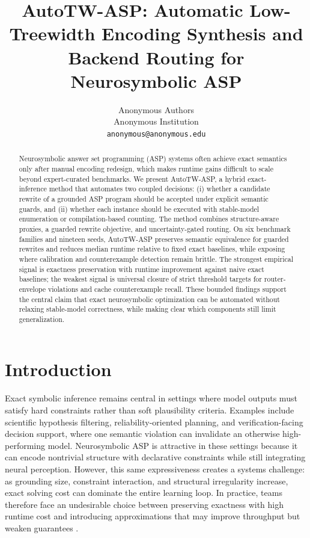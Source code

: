 \documentclass{article} %
\title{AutoTW-ASP: Automatic Low-Treewidth Encoding Synthesis and Backend Routing for Neurosymbolic ASP}
\author{Anonymous Authors \\
Anonymous Institution \\
\texttt{anonymous@anonymous.edu}}
\begin{document}
\maketitle

\begin{abstract}
Neurosymbolic answer set programming (ASP) systems often achieve exact semantics only after manual encoding redesign, which makes runtime gains difficult to scale beyond expert-curated benchmarks. We present AutoTW-ASP, a hybrid exact-inference method that automates two coupled decisions: (i) whether a candidate rewrite of a grounded ASP program should be accepted under explicit semantic guards, and (ii) whether each instance should be executed with stable-model enumeration or compilation-based counting. The method combines structure-aware proxies, a guarded rewrite objective, and uncertainty-gated routing. On six benchmark families and nineteen seeds, AutoTW-ASP preserves semantic equivalence for guarded rewrites and reduces median runtime relative to fixed exact baselines, while exposing where calibration and counterexample detection remain brittle. The strongest empirical signal is exactness preservation with runtime improvement against naive exact baselines; the weakest signal is universal closure of strict threshold targets for router-envelope violations and cache counterexample recall. These bounded findings support the central claim that exact neurosymbolic optimization can be automated without relaxing stable-model correctness, while making clear which components still limit generalization.
\end{abstract}

\section{Introduction}
\label{sec:intro}
Exact symbolic inference remains central in settings where model outputs must satisfy hard constraints rather than soft plausibility criteria. Examples include scientific hypothesis filtering, reliability-oriented planning, and verification-facing decision support, where one semantic violation can invalidate an otherwise high-performing model. Neurosymbolic ASP is attractive in these settings because it can encode nontrivial structure with declarative constraints while still integrating neural perception. However, this same expressiveness creates a systems challenge: as grounding size, constraint interaction, and structural irregularity increase, exact solving cost can dominate the entire learning loop. In practice, teams therefore face an undesirable choice between preserving exactness with high runtime cost and introducing approximations that may improve throughput but weaken guarantees \citep{src_012,src_019,src_033,src_039,src_041,src_044}.
\end{document}
